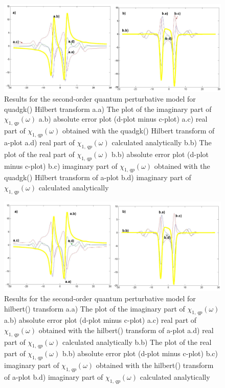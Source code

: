 \documentclass[12pt,twoside,a4paper]{article}
\numberwithin{equation}{subsection}
\numberwithin{figure}{subsection}
\begin{document}
\begin{figure}
  \includegraphics[width=150mm]{img/quadgk_qp2.png}
  \caption{Results for the second-order quantum perturbative model for quadgk() Hilbert transform
    a.a) The plot of the imaginary part of ${\chi_{1, \, qp}}(\omega )$
    a.b) absolute error plot (d-plot minus c-plot) 
    a.c) real part of ${\chi_{1, \, qp}}(\omega )$ obtained with the quadgk() Hilbert transform of a-plot 
    a.d) real part of ${\chi_{1, \, qp}}(\omega )$ calculated analytically 
    b.b) The plot of the real part of ${\chi_{1, \, qp}}(\omega )$ 
    b.b) absolute error plot (d-plot minus c-plot) 
    b.c) imaginary part of ${\chi_{1, \, qp}}(\omega )$ obtained with the quadgk()  Hilbert transform of a-plot 
    b.d) imaginary part of ${\chi_{1, \, qp}}(\omega )$ calculated analytically  
    \label{fig:quadgk_qp2}
  }
\end{figure}

\begin{figure}
  \includegraphics[width=150mm]{img/hilb_qp2.png}
  \caption{Results for the second-order quantum perturbative model for hilbert() transform
    a.a) The plot of the imaginary part of ${\chi_{1, \, qp}}(\omega )$
    a.b) absolute error plot (d-plot minus c-plot) 
    a.c) real part of ${\chi_{1, \, qp}}(\omega )$ obtained with the hilbert() transform of a-plot 
    a.d) real part of ${\chi_{1, \, qp}}(\omega )$ calculated analytically 
    b.b) The plot of the real part of ${\chi_{1, \, qp}}(\omega )$ 
    b.b) absolute error plot (d-plot minus c-plot) 
    b.c) imaginary part of ${\chi_{1, \, qp}}(\omega )$ obtained with the hilbert() transform of a-plot 
    b.d) imaginary part of ${\chi_{1, \, qp}}(\omega )$ calculated analytically  
    \label{fig:hilb_qp2}
  }
\end{figure}
\end{document}
